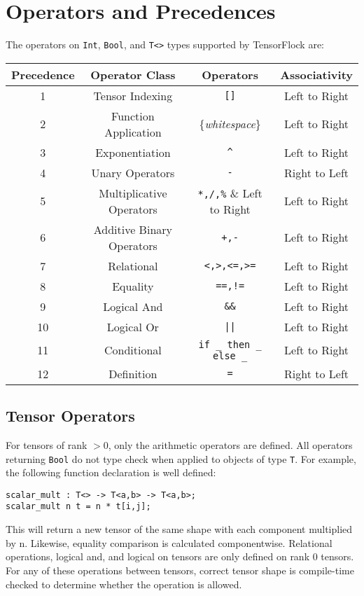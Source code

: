 \section{Operators and Precedences}%
\label{sec:operators_and_precedences}

The operators on \verb|Int|, \verb|Bool|, and \verb|T<>| types
supported by TensorFlock are:

\begin{center}
\begin{tabular}{ |c|c|c|c| } 
 \hline
 Precedence & Operator Class & Operators & Associativity\\ 
 \hline
 1 & Tensor Indexing & \verb|[]| & Left to Right\\
 \hline
 2 & Function Application & \{\textit{whitespace}\} & Left to Right \\
 \hline
 3 & Exponentiation & \verb|^| & Left to Right\\
 \hline
 4 & Unary Operators & \verb|-| & Right to Left \\
 \hline
 5 & Multiplicative Operators & \verb|*,/,%| & Left to Right\\
 \hline
 6 & Additive Binary Operators & \verb|+,-| & Left to Right\\
 \hline
 7 & Relational & \verb|<,>,<=,>=| & Left to Right\\
 \hline
 8 & Equality & \verb|==,!=| & Left to Right\\
 \hline
 9 & Logical And & \verb|&&| & Left to Right\\
 \hline
 10 & Logical Or & \verb!||! & Left to Right\\
 \hline
 11 & Conditional & \verb!if _ then _ else _! & Left to Right\\
 \hline
 12 & Definition & \verb|=| & Right to Left\\
 \hline
\end{tabular}
\end{center}

\subsection{Tensor Operators}
For tensors of rank $> 0$, only the arithmetic operators are defined. All
operators returning \verb|Bool| do not type check when applied to objects of
type \verb|T|.
For example, the following function declaration is well defined:
\begin{lstlisting}
scalar_mult : T<> -> T<a,b> -> T<a,b>;
scalar_mult n t = n * t[i,j];
\end{lstlisting}
This will return a new tensor of the same shape with each component multiplied
by n. Likewise, equality comparison is calculated componentwise. Relational
operations, logical and, and logical on tensors are only defined on rank
0 tensors.  For any of these operations between tensors, correct tensor shape is
compile-time checked to determine whether the operation is allowed.

